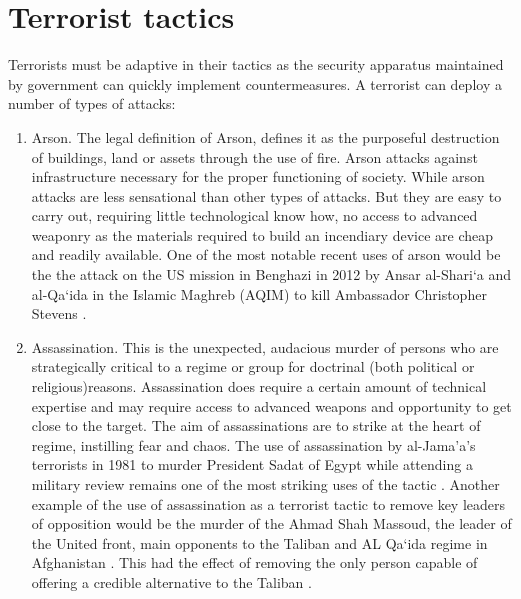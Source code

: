 \section{Terrorist tactics}
Terrorists must be adaptive in their tactics \citep{bennett2007understanding} as the security apparatus  maintained by government can quickly implement countermeasures. A terrorist can deploy a number  of types of attacks:
\begin{enumerate}
\item Arson. The legal definition of  Arson, defines it as the purposeful destruction of buildings, land or assets through the use of fire. Arson attacks against infrastructure necessary for the proper functioning of society. While arson attacks are less sensational than other types of attacks. But they are easy to carry out, requiring little technological know how, no access to advanced weaponry as the materials  required to build an incendiary device are cheap and readily available. One of the most notable recent uses of arson would be the the attack on the US mission in Benghazi in 2012 by Ansar al-Shari`a and al-Qa`ida in the Islamic Maghreb (AQIM) to kill Ambassador Christopher Stevens \citep{maldonado2015leading}.
\item Assassination. This is the unexpected, audacious murder of persons who are strategically critical to a regime or group for doctrinal (both political or religious)reasons. Assassination does require a certain amount of technical expertise and may require access to advanced weapons and opportunity to get close to the target. The aim of assassinations are to strike at the heart of regime, instilling fear and chaos.  The use of assassination by al-Jama'a's terrorists in  1981 to murder President  Sadat of Egypt while attending a military review remains one of the most striking uses of the tactic \citep{haykal1983autumn}. Another example of the use of assassination as a terrorist tactic to remove key leaders of opposition would be the murder of the Ahmad Shah Massoud, the leader of the United front, main opponents to the Taliban and AL Qa`ida regime in Afghanistan \citep{wolf2003assassination}. This had the effect of removing the only person capable of offering a credible alternative to the Taliban \citep{rashid2001fires}.

\end{enumerate}
